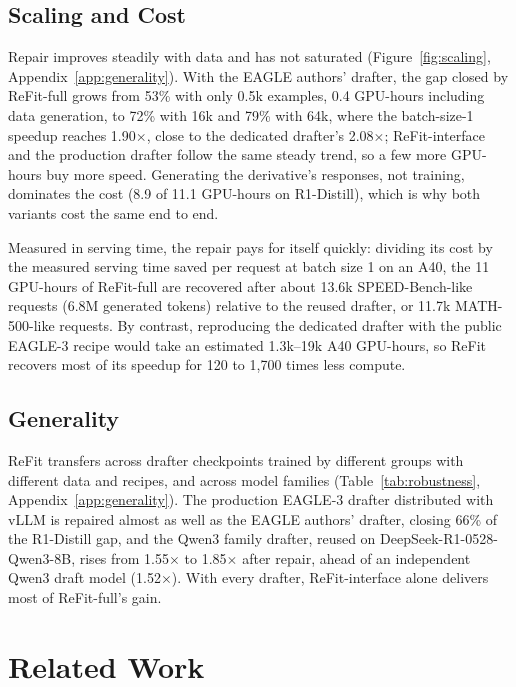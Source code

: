 \documentclass[11pt]{article}
\newcommand{\refit}{ReFit}
\newcommand{\refitI}{ReFit-interface}
\newcommand{\refitF}{ReFit-full}
\begin{document}
\subsection{Scaling and Cost}

Repair improves steadily with data and has not saturated (Figure~\ref{fig:scaling}, Appendix~\ref{app:generality}).
With the EAGLE authors' drafter, the gap closed by \refitF{} grows from 53\% with only 0.5k examples, 0.4 GPU-hours including data generation, to 72\% with 16k and 79\% with 64k, where the batch-size-1 speedup reaches 1.90$\times$, close to the dedicated drafter's 2.08$\times$; \refitI{} and the production drafter follow the same steady trend, so a few more GPU-hours buy more speed.
Generating the derivative's responses, not training, dominates the cost (8.9 of 11.1 GPU-hours on R1-Distill), which is why both variants cost the same end to end.

Measured in serving time, the repair pays for itself quickly: dividing its cost by the measured serving time saved per request at batch size 1 on an A40, the 11 GPU-hours of \refitF{} are recovered after about 13.6k SPEED-Bench-like requests (6.8M generated tokens) relative to the reused drafter, or 11.7k MATH-500-like requests.
By contrast, reproducing the dedicated drafter with the public EAGLE-3 recipe would take an estimated 1.3k--19k A40 GPU-hours, so \refit{} recovers most of its speedup for 120 to 1,700 times less compute.

\subsection{Generality}

\refit{} transfers across drafter checkpoints trained by different groups with different data and recipes, and across model families (Table~\ref{tab:robustness}, Appendix~\ref{app:generality}).
The production EAGLE-3 drafter distributed with vLLM is repaired almost as well as the EAGLE authors' drafter, closing 66\% of the R1-Distill gap, and the Qwen3 family drafter, reused on DeepSeek-R1-0528-Qwen3-8B, rises from 1.55$\times$ to 1.85$\times$ after repair, ahead of an independent Qwen3 draft model (1.52$\times$).
With every drafter, \refitI{} alone delivers most of \refitF{}'s gain.

\section{Related Work}
\label{sec:related}
\end{document}
